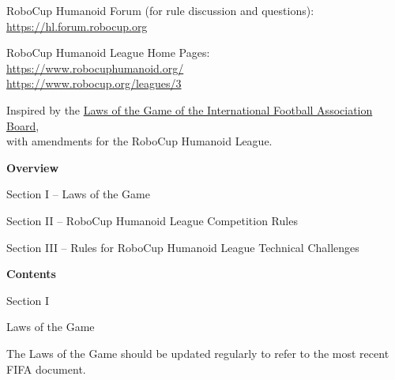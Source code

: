 \documentclass[a4paper]{article}
\begin{document}
\medskip
RoboCup Humanoid Forum (for rule discussion and questions):\\
\url{https://hl.forum.robocup.org}

\medskip
RoboCup Humanoid League Home Pages:\\
\url{https://www.robocuphumanoid.org/}\\
\url{https://www.robocup.org/leagues/3}

\medskip
Inspired by the \href{https://resources.fifa.com/image/upload/laws-of-the-game-2018-19.pdf?cloudid=khhloe2xoigyna8juxw3}{\textcolor[rgb]{0,0,0.5}{Laws of the Game of the International Football Association Board}},\\
with amendments for the RoboCup Humanoid League.

\setcounter{figure}{0}

\clearpage

{\bfseries\color[rgb]{0.4,0.4,0.4}
Overview}

\bigskip

Section I -- Laws of the Game

\bigskip

Section II -- RoboCup Humanoid League Competition Rules

\bigskip

Section III -- Rules for RoboCup Humanoid League Technical Challenges

\clearpage

{\bfseries\color[rgb]{0.4,0.4,0.4}
Contents}

\renewcommand\contentsname{}
\vspace*{-1cm}
\tableofcontents
{}



\clearpage

\begin{center}
\Huge\bfseries{
\vspace*{3cm}
Section I

\vspace*{2cm}

Laws of the Game}
\end{center}

\vspace*{12cm}

The Laws of the Game should be updated regularly to refer to the most
recent FIFA document.
\end{document}
